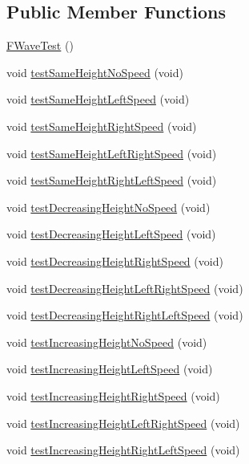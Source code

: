 \subsection*{Public Member Functions}
\begin{DoxyCompactItemize}
\item 
\hyperlink{classFWaveTest_a637e3a21850ed7432394b19d1f8320d1}{F\+Wave\+Test} ()
\item 
void \hyperlink{classFWaveTest_aad1779e385672a5fcea0fb09cbd8a2f0}{test\+Same\+Height\+No\+Speed} (void)
\item 
void \hyperlink{classFWaveTest_aed2db9d70b98e7b7924fcb8705bbf509}{test\+Same\+Height\+Left\+Speed} (void)
\item 
void \hyperlink{classFWaveTest_a4cffba9a84aeb963b6b8d4ac79efe227}{test\+Same\+Height\+Right\+Speed} (void)
\item 
void \hyperlink{classFWaveTest_a284fbedaff0f4e2a98ec868926176773}{test\+Same\+Height\+Left\+Right\+Speed} (void)
\item 
void \hyperlink{classFWaveTest_a5ceb6cf106458f0a0110ac13fe2c3f35}{test\+Same\+Height\+Right\+Left\+Speed} (void)
\item 
void \hyperlink{classFWaveTest_abf28f88dc07c66d8ccd7541a2fc9b901}{test\+Decreasing\+Height\+No\+Speed} (void)
\item 
void \hyperlink{classFWaveTest_a817892593d58cf1dad61a2abb0810378}{test\+Decreasing\+Height\+Left\+Speed} (void)
\item 
void \hyperlink{classFWaveTest_aaae1f57e2ef62d53bff1169d84aa7059}{test\+Decreasing\+Height\+Right\+Speed} (void)
\item 
void \hyperlink{classFWaveTest_a2dc496f15de60f5d199d6b1a35b596f3}{test\+Decreasing\+Height\+Left\+Right\+Speed} (void)
\item 
void \hyperlink{classFWaveTest_a24b35d3400c5ee91be94bf7ba47e82bf}{test\+Decreasing\+Height\+Right\+Left\+Speed} (void)
\item 
void \hyperlink{classFWaveTest_abd75e73da77f86f5145dd9ed1796f0fc}{test\+Increasing\+Height\+No\+Speed} (void)
\item 
void \hyperlink{classFWaveTest_aa6a036225ee4f6a00d40ba439899933d}{test\+Increasing\+Height\+Left\+Speed} (void)
\item 
void \hyperlink{classFWaveTest_a3e4e03f910ee006e0dce95cb2276a76a}{test\+Increasing\+Height\+Right\+Speed} (void)
\item 
void \hyperlink{classFWaveTest_a57b9d687f5a7311739883c9931d1e301}{test\+Increasing\+Height\+Left\+Right\+Speed} (void)
\item 
void \hyperlink{classFWaveTest_aaf371e755b499555a6daf142c9e5173f}{test\+Increasing\+Height\+Right\+Left\+Speed} (void)
\end{DoxyCompactItemize}

